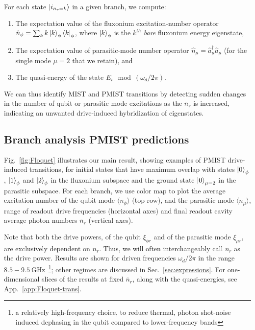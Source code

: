 \documentclass[%
reprint,
superscriptaddress,
 amsmath,amssymb,
 aps,
 prx,
longbibliography,
floatfix,
]{revtex4-2}
\begin{document}
For each state $\ket{i_{\bar n_r=k}}$ in a given branch, we compute:
\begin{enumerate}
    \item The expectation value of the fluxonium excitation-number operator $\hat n_\phi=\sum_k k\ket{k}_\phi\bra{k}_\phi$,  where $\ket{k}_\phi$ is the $k^{th}$ {\it bare} fluxonium energy eigenstate,
    \item The expectation value of parasitic-mode number operator $\hat n_\mu=\hat a_{\mu}^\dagger \hat a_{\mu}$ (for the single mode $\mu=2$ that we retain), and 
    \item The quasi-energy of the state $E_i \mod (\omega_d/2\pi)$.
\end{enumerate}
We can thus identify MIST and PMIST transitions by detecting sudden changes in the number of qubit or parasitic mode excitations as the $\bar{n}_r$ is increased, indicating an unwanted drive-induced hybridization of eigenstates.  


\subsection{Branch analysis PMIST predictions}

Fig.~\ref{fig:Floquet} illustrates our main result, showing examples of PMIST drive-induced transitions,   
for initial states that have maximum overlap with states $\ket{0}_\phi$, $\ket{1}_\phi$ and $\ket{2}_\phi$ in the fluxonium subspace and the ground state $\ket{0}_{\mu=2}$ in the parasitic subspace. 
For each branch, we use color map to plot the average excitation number of the qubit mode $\langle n_\phi \rangle$ (top row), and the parasitic mode $\langle n_\mu \rangle$, range of readout drive frequencies (horizontal axes) and final readout cavity average photon numbers $ \bar n_r$ (vertical axes). 

Note that both the drive powers, of the qubit $\xi_{\phi r}$ and of the parasitic mode $\xi_{\mu r}$, are exclusively dependent on $\bar n_r$. Thus, we will often interchangeably call $\bar n_r$ as the drive power. Results are shown for driven frequencies $\omega_d / 2 \pi$ in the range  
$8.5 - 9.5 \ \mathrm{GHz}$~\footnote{a relatively high-frequency choice, to reduce thermal, photon shot-noise induced dephasing in the qubit compared to lower-frequency bands}; other regimes are discussed in Sec.~\ref{sec:expressions}. For one-dimensional slices of the results at fixed $\bar n_r$, along with the quasi-energies, see App.~\ref{app:Floquet-trans}. 
\end{document}
